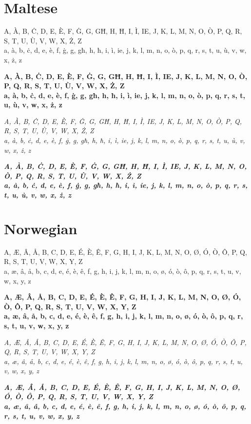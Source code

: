 \documentclass[12pt]{article}
\begin{document}
\section{Maltese}
A, À, B, Ċ, D, E, È, F, Ġ, G, GĦ, H, Ħ, I, Ì, IE, J, K, L, M, N, O, Ò, P, Q, R, S, T, U, Ù, V, W, X, Ż, Z \\
a, à, b, ċ, d, e, è, f, ġ, g, għ, h, ħ, i, ì, ie, j, k, l, m, n, o, ò, p, q, r, s, t, u, ù, v, w, x, ż, z

\textbf{
A, À, B, Ċ, D, E, È, F, Ġ, G, GĦ, H, Ħ, I, Ì, IE, J, K, L, M, N, O, Ò, P, Q, R, S, T, U, Ù, V, W, X, Ż, Z \\
a, à, b, ċ, d, e, è, f, ġ, g, għ, h, ħ, i, ì, ie, j, k, l, m, n, o, ò, p, q, r, s, t, u, ù, v, w, x, ż, z
}

\textit{
A, À, B, Ċ, D, E, È, F, Ġ, G, GĦ, H, Ħ, I, Ì, IE, J, K, L, M, N, O, Ò, P, Q, R, S, T, U, Ù, V, W, X, Ż, Z \\
a, à, b, ċ, d, e, è, f, ġ, g, għ, h, ħ, i, ì, ie, j, k, l, m, n, o, ò, p, q, r, s, t, u, ù, v, w, x, ż, z
}

\textbf{\textit{
A, À, B, Ċ, D, E, È, F, Ġ, G, GĦ, H, Ħ, I, Ì, IE, J, K, L, M, N, O, Ò, P, Q, R, S, T, U, Ù, V, W, X, Ż, Z \\
a, à, b, ċ, d, e, è, f, ġ, g, għ, h, ħ, i, ì, ie, j, k, l, m, n, o, ò, p, q, r, s, t, u, ù, v, w, x, ż, z
}}


\clearpage
\section{Norwegian}
A, Æ, Â, Å, B, C, D, E, É, È, Ê, F, G, H, I, J, K, L, M, N, O, Ø, Ó, Ò, Ô, P, Q, R, S, T, U, V, W, X, Y, Z \\
a, æ, â, å, b, c, d, e, é, è, ê, f, g, h, i, j, k, l, m, n, o, ø, ó, ò, ô, p, q, r, s, t, u, v, w, x, y, z

\textbf{
A, Æ, Â, Å, B, C, D, E, É, È, Ê, F, G, H, I, J, K, L, M, N, O, Ø, Ó, Ò, Ô, P, Q, R, S, T, U, V, W, X, Y, Z \\
a, æ, â, å, b, c, d, e, é, è, ê, f, g, h, i, j, k, l, m, n, o, ø, ó, ò, ô, p, q, r, s, t, u, v, w, x, y, z
} 

\textit{
A, Æ, Â, Å, B, C, D, E, É, È, Ê, F, G, H, I, J, K, L, M, N, O, Ø, Ó, Ò, Ô, P, Q, R, S, T, U, V, W, X, Y, Z \\
a, æ, â, å, b, c, d, e, é, è, ê, f, g, h, i, j, k, l, m, n, o, ø, ó, ò, ô, p, q, r, s, t, u, v, w, x, y, z
}

\textbf{\textit{
A, Æ, Â, Å, B, C, D, E, É, È, Ê, F, G, H, I, J, K, L, M, N, O, Ø, Ó, Ò, Ô, P, Q, R, S, T, U, V, W, X, Y, Z \\
a, æ, â, å, b, c, d, e, é, è, ê, f, g, h, i, j, k, l, m, n, o, ø, ó, ò, ô, p, q, r, s, t, u, v, w, x, y, z
}}
\end{document}
